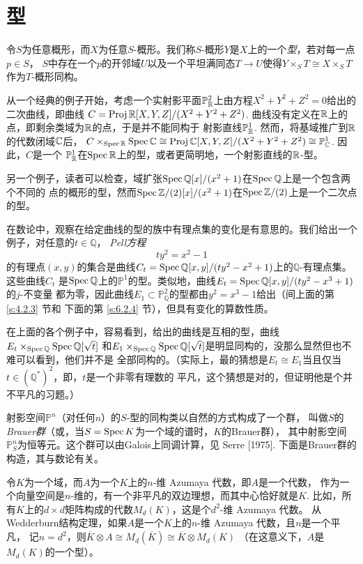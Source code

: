 \section{型}\label{s:4.4}


令$S$为任意概形，而$X$为任意$S$-概形。我们称$S$-概形$Y$是$X$上的一个\textit{型}，若对每一点$p\in S$，
$S$中存在一个$p$的开邻域$U$以及一个平坦满同态$T\to U$使得$Y\times_S T\cong X\times_S T$作为$T$-概形同构。

从一个经典的例子开始，考虑一个实射影平面$\mathbb{P}_{\mathbb{R}}^2$上由方程$X^2+Y^2+Z^2=0$给出的二次曲线，即曲线
$C=\operatorname{Proj} \mathbb{R}[X,Y,Z]/(X^2+Y^2+Z^2)$. 曲线没有定义在$\mathbb{R}$上的点，即剩余类域为$\mathbb{R}$的点，于是并不能同构于
射影直线$\mathbb{P}_{\mathbb{R}}^1$. 然而，将基域推广到$\mathbb{R}$的代数闭域$\mathbb{C}$后，
$C\times_{\operatorname{Spec} \mathbb{R}}\operatorname{Spec} \mathbb{C}\cong \operatorname{Proj} \mathbb{C}[X,Y,Z]/(X^2+Y^2+Z^2)\cong \mathbb{P}_{\mathbb{C}}^1$. 因此，$C$是一个
$\mathbb{P}_{\mathbb{R}}^1$在$\operatorname{Spec} \mathbb{R}$上的型，或者更简明地，一个射影直线的$\mathbb{R}$-型。

另一个例子，读者可以检查，域扩张$\operatorname{Spec} \mathbb Q[x]/(x^2+1)$在$\operatorname{Spec} \mathbb Q$上是一个包含两个不同的
点的概形的型，然而$\operatorname{Spec} \mathbb{Z}/(2)[x]/(x^2+1)$在$\operatorname{Spec} \mathbb{Z}/(2)$上是一个二次点的型。

在数论中，观察在给定曲线的型的族中有理点集的变化是有意思的。我们给出一个例子，对任意的$t\in \mathbb Q$，
\textit{Pell方程}
\[
    ty^2=x^2-1
\]
的有理点$(x,y)$的集合是曲线$C_t=\operatorname{Spec} \mathbb Q[x,y]/(ty^2-x^2+1)$上的$\mathbb Q$-有理点集。这些曲线$C_t$
是$\operatorname{Spec} \mathbb Q$上的$\mathbb P^1$的型。类似地，曲线$E_t=\operatorname{Spec} \mathbb Q[x,y]/(ty^2-x^3+1)$的$j$-不变量
都为零，因此曲线$E_1\subset \mathbb P_{\mathbb Q}^2$的型都由$y^2=x^3-1$给出（间上面的第 \ref{s:4.2.3} 节和
下面的第 \ref{s:6.2.4} 节），但具有变化的算数性质。

在上面的各个例子中，容易看到，给出的曲线是互相的型，曲线$E_t\times_{\operatorname{Spec} \mathbb Q}\operatorname{Spec} \mathbb Q[\sqrt{t}]$
和$E_1\times_{\operatorname{Spec} \mathbb Q}\operatorname{Spec} \mathbb Q[\sqrt{t}]$是明显同构的，没那么显然但也不难可以看到，他们并不是
全部同构的。（实际上，最\naive 的猜想是$E_t\cong E_1$当且仅当$t\in (\mathbb Q^*)^2$，即，$t$是一个非零有理数的
平凡，这个猜想是对的，但证明他是个并不平凡的习题。）


射影空间$\mathbb P^n$（对任何$n$）的$S$-型的同构类以自然的方式构成了一个群，
叫做$S$的\textit{Brauer群}（或，当$S=\operatorname{Spec} K$为一个域的谱时，$K$的Brauer群），
其中射影空间$\mathbb P_S^n$为恒等元。这个群可以由Galois上同调计算，见
Serre [1975]. 下面是Brauer群的构造，其与数论有关。

令$K$为一个域，而$A$为一个$K$上的$n$-维 Azumaya 代数，即$A$是一个代数，
作为一个向量空间是$n$-维的，有一个非平凡的双边理想，而其中心恰好就是$K$.
比如，所有$K$上的$d\times d$矩阵构成的代数$M_d(K)$，这是个$d^2$-维 Azumaya 代数。
从Wedderburn结构定理，如果$A$是一个$K$上的$n$-维 Azumaya 代数，且$n$是一个平凡，
记$n=d^2$，则$\overline{K} \otimes A \cong M_d(\overline{K}) \cong 
\overline{K} \otimes M_d(K)$ （在这意义下，$A$是$M_d(K)$的一个型）。

